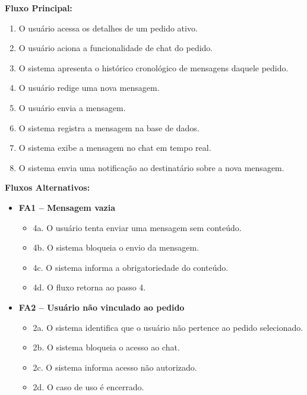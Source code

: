 ﻿\documentclass[12pt,a4paper]{article}
\begin{document}
\vspace{0.5em}
\noindent\textbf{Fluxo Principal:}
\begin{enumerate}[label=\arabic*.]
    \item O usuário acessa os detalhes de um pedido ativo.
    \item O usuário aciona a funcionalidade de chat do pedido.
    \item O sistema apresenta o histórico cronológico de mensagens daquele pedido.
    \item O usuário redige uma nova mensagem.
    \item O usuário envia a mensagem.
    \item O sistema registra a mensagem na base de dados.
    \item O sistema exibe a mensagem no chat em tempo real.
    \item O sistema envia uma notificação ao destinatário sobre a nova mensagem.
\end{enumerate}

\vspace{0.5em}
\noindent\textbf{Fluxos Alternativos:}
\begin{itemize}[leftmargin=*]
    \item \textbf{FA1 – Mensagem vazia}
    \begin{itemize}[label={}, leftmargin=0.5cm]
        \item 4a. O usuário tenta enviar uma mensagem sem conteúdo.
        \item 4b. O sistema bloqueia o envio da mensagem.
        \item 4c. O sistema informa a obrigatoriedade do conteúdo.
        \item 4d. O fluxo retorna ao passo 4.
    \end{itemize}
    
    \item \textbf{FA2 – Usuário não vinculado ao pedido}
    \begin{itemize}[label={}, leftmargin=0.5cm]
        \item 2a. O sistema identifica que o usuário não pertence ao pedido selecionado.
        \item 2b. O sistema bloqueia o acesso ao chat.
        \item 2c. O sistema informa acesso não autorizado.
        \item 2d. O caso de uso é encerrado.
    \end{itemize}
\end{itemize}
\end{document}
